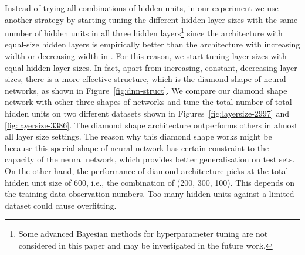 \documentclass{llncs}
\begin{document}
Instead of trying all combinations of hidden units, in our experiment we use another strategy by starting tuning the different hidden layer sizes with the same number of hidden units in all three hidden layers\footnote{Some advanced Bayesian methods for hyperparameter tuning \cite{snoek2012practical} are not considered in this paper and may be investigated in the future work.} since the architecture with equal-size hidden layers is empirically better than the architecture with increasing width or decreasing width in \cite{larochelle2009exploring}. For this reason, we start tuning layer sizes with equal hidden layer sizes. In fact, apart from increasing, constant, decreasing layer sizes, there is a more effective structure, which is the diamond shape of neural networks, as shown in Figure~\ref{fig:dnn-struct}. We compare our diamond shape network with other three shapes of networks and tune the total number of total hidden units on two different datasets shown in Figures~\ref{fig:layersize-2997} and \ref{fig:layersize-3386}. The diamond shape architecture outperforms others in almost all layer size settings. The reason why this diamond shape works might be because this special shape of neural network has certain constraint to the capacity of the neural network, which provides better generalisation on test sets. On the other hand, the performance of diamond architecture picks at the total hidden unit size of 600, i.e., the combination of (200, 300, 100). This depends on the training data observation numbers. Too many hidden units against a limited dataset could cause overfitting.



\end{document}
